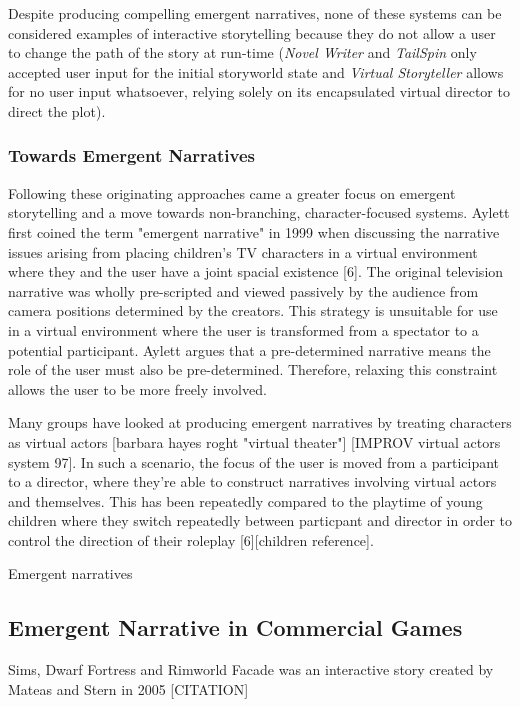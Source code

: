 \documentclass{sig-alternate-05-2015}
\begin{document}
Despite producing compelling emergent narratives, none of these systems can be considered examples of interactive storytelling because they do not allow a user to change the path of the story at run-time (\textit{Novel Writer} and \textit{TailSpin} only accepted user input for the initial storyworld state and \textit{Virtual Storyteller} allows for no user input whatsoever, relying solely on its encapsulated virtual director to direct the plot).\\

\subsubsection{Towards Emergent Narratives}

\noindent Following these originating approaches came a greater focus on emergent storytelling and a move towards non-branching, character-focused systems. Aylett first coined the term "emergent narrative" in 1999 when discussing the narrative issues arising from placing children's TV characters in a virtual environment where they and the user have a joint spacial existence [6]. The original television narrative was wholly pre-scripted and viewed passively by the audience from camera positions determined by the creators. This strategy is unsuitable for use in a virtual environment where the user is transformed from a spectator to a potential participant. Aylett argues that a pre-determined narrative means the role of the user must also be pre-determined. Therefore, relaxing this constraint allows the user to be more freely involved. 

Many groups have looked at producing emergent narratives by treating characters as virtual actors [barbara hayes roght "virtual theater"] [IMPROV virtual actors system 97]. In such a scenario, the focus of the user is moved from a participant to a director, where they're able to construct narratives involving virtual actors and themselves. This has been repeatedly compared to the playtime of young children where they switch repeatedly between particpant and director in order to control the direction of their roleplay [6][children reference]. 

Emergent narratives 

\subsection{Emergent Narrative in Commercial Games}
Sims, Dwarf Fortress and Rimworld
Facade was an interactive story created by Mateas and Stern in 2005 [CITATION]
\end{document}
